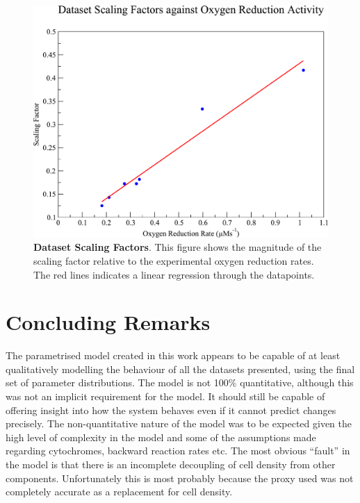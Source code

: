 \begin{figure}[tbp]
 \centering
 \includegraphics[width=15cm, clip=true]{./09-completedmodel/data/scaling.pdf}
 \caption[Dataset Scaling Factors]{{\bf Dataset Scaling Factors}. This figure shows the magnitude of the scaling factor relative to the experimental oxygen reduction rates. The red lines indicates a linear regression through the datapoints.
 \label{fig:scaling-factors}}
\end{figure}

\section{Concluding Remarks}
The parametrised model created in this work appears to be capable of at least qualitatively modelling the behaviour of all the datasets presented, using the final set of parameter distributions. The model is not 100\% quantitative, although this was not an implicit requirement for the model. It should still be capable of offering insight into how the system behaves even if it cannot predict changes precisely. The non-quantitative nature of the model was to be expected given the high level of complexity in the model and some of the assumptions made regarding cytochromes, backward reaction rates etc. The most obvious ``fault'' in the model is that there is an incomplete decoupling of cell density from other components. Unfortunately this is most probably because the proxy used was not completely accurate as a replacement for cell density.

